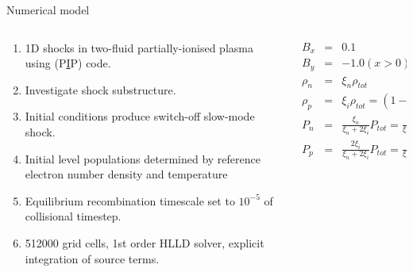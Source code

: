 \documentclass[10pt,aspectratio=169,usenames,dvipsnames]{beamer}
\begin{document}
\begin{frame}{Numerical model}
\begin{columns}
\begin{column}{0.5\textwidth}
\begin{enumerate}
\item 1D shocks in two-fluid partially-ionised plasma using (P\underline{I}P) code.
\item Investigate shock substructure.
\item Initial conditions produce switch-off slow-mode shock.
\item Initial level populations determined by reference electron number density and temperature
\item Equilibrium recombination timescale set to $10^{-5}$ of collisional timestep.
\item 512000 grid cells, 1st order HLLD solver, explicit integration of source terms.
\end{enumerate}
\end{column}
\begin{column}{0.5\textwidth}
\begin{eqnarray}
B_x &=& 0.1  \nonumber\\
B_y &=& -1.0 (x>0), 1.0 (x<0) \nonumber \\
\rho _n &=& \xi _n \rho _{tot} \nonumber \\
\rho _p &=& \xi _i \rho _{tot} = (1- \xi _n) \rho _{tot} \nonumber \\
P_n &=& \frac{\xi _n}{\xi_n + 2 \xi _i} P_{tot} =  \frac{\xi _n}{\xi_n + 2 \xi _i} \beta \frac{B_0 ^2}{2} \nonumber \\
P_p &=& \frac{2 \xi _i}{\xi_n + 2 \xi _i} P_{tot} =  \frac{2 \xi _i}{\xi_n + 2 \xi _i} \beta \frac{B_0 ^2}{2} \nonumber
\end{eqnarray}
\end{column}
\end{columns}
\end{frame}
\end{document}

